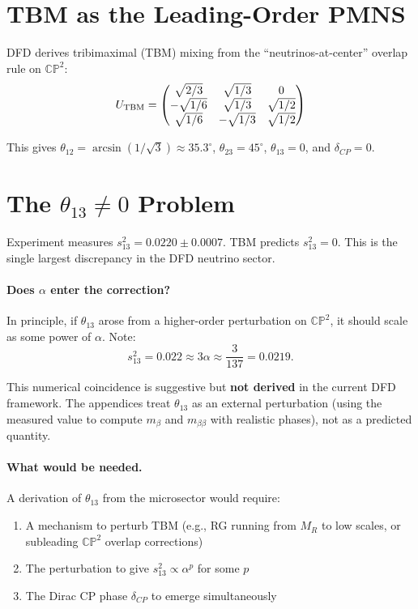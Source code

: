 \documentclass[11pt,a4paper]{article}
\begin{document}
\section{TBM as the Leading-Order PMNS}

DFD derives tribimaximal (TBM) mixing from the ``neutrinos-at-center''
overlap rule on $\mathbb{CP}^2$:
\begin{equation}
U_{\rm TBM} = \begin{pmatrix}
\sqrt{2/3} & \sqrt{1/3} & 0 \\
-\sqrt{1/6} & \sqrt{1/3} & \sqrt{1/2} \\
\sqrt{1/6} & -\sqrt{1/3} & \sqrt{1/2}
\end{pmatrix}
\end{equation}

This gives $\theta_{12} = \arcsin(1/\sqrt{3}) \approx 35.3^\circ$,
$\theta_{23} = 45^\circ$, $\theta_{13} = 0$, and $\delta_{CP} = 0$.

\section{The $\theta_{13} \neq 0$ Problem}

Experiment measures $s_{13}^2 = 0.0220 \pm 0.0007$. TBM predicts
$s_{13}^2 = 0$. This is the single largest discrepancy in the DFD
neutrino sector.

\paragraph{Does $\alpha$ enter the correction?}
In principle, if $\theta_{13}$ arose from a higher-order perturbation on
$\mathbb{CP}^2$, it should scale as some power of $\alpha$. Note:
\begin{equation}
s_{13}^2 = 0.022 \approx 3\alpha \approx \frac{3}{137} = 0.0219.
\end{equation}

This numerical coincidence is suggestive but \textbf{not derived} in the
current DFD framework. The appendices treat $\theta_{13}$ as an external
perturbation (using the measured value to compute $m_\beta$ and
$m_{\beta\beta}$ with realistic phases), not as a predicted quantity.

\paragraph{What would be needed.}
A derivation of $\theta_{13}$ from the microsector would require:
\begin{enumerate}
\item A mechanism to perturb TBM (e.g., RG running from $M_R$ to
  low scales, or subleading $\mathbb{CP}^2$ overlap corrections)
\item The perturbation to give $s_{13}^2 \propto \alpha^p$ for some $p$
\item The Dirac CP phase $\delta_{CP}$ to emerge simultaneously
\end{enumerate}
\end{document}
